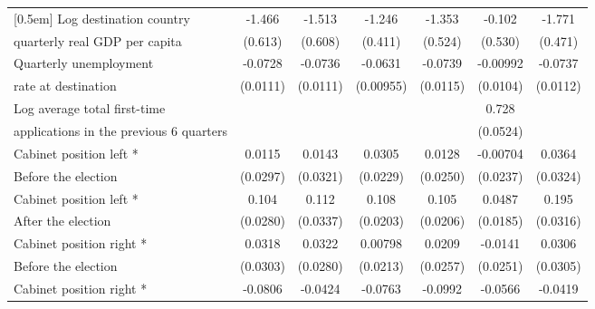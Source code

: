 \begin{table}[htbp]
\begin{tabular}{l*{6}{c}}
[0.5em]
Log destination country &      -1.466\sym{*}  &      -1.513\sym{*}  &      -1.246\sym{**} &      -1.353\sym{*}  &      -0.102         &      -1.771\sym{***}\\
quarterly real GDP per capita                    &     (0.613)         &     (0.608)         &     (0.411)         &     (0.524)         &     (0.530)         &     (0.471)         \\
[0.5em]
Quarterly unemployment &     -0.0728\sym{***}&     -0.0736\sym{***}&     -0.0631\sym{***}&     -0.0739\sym{***}&    -0.00992         &     -0.0737\sym{***}\\
rate at destination                    &    (0.0111)         &    (0.0111)         &   (0.00955)         &    (0.0115)         &    (0.0104)         &    (0.0112)         \\
[0.5em]
Log average total first-time &                     &                     &                     &                     &       0.728\sym{***}&                     \\
applications in the previous 6 quarters                    &                     &                     &                     &                     &    (0.0524)         &                     \\
[0.5em]
Cabinet position left * &      0.0115         &      0.0143         &      0.0305         &      0.0128         &    -0.00704         &      0.0364         \\
Before the election                    &    (0.0297)         &    (0.0321)         &    (0.0229)         &    (0.0250)         &    (0.0237)         &    (0.0324)         \\
[0.5em]
Cabinet position left * &       0.104\sym{***}&       0.112\sym{***}&       0.108\sym{***}&       0.105\sym{***}&      0.0487\sym{*}  &       0.195\sym{***}\\
After the election                    &    (0.0280)         &    (0.0337)         &    (0.0203)         &    (0.0206)         &    (0.0185)         &    (0.0316)         \\
[0.5em]
Cabinet position right * &      0.0318         &      0.0322         &     0.00798         &      0.0209         &     -0.0141         &      0.0306         \\
Before the election                   &    (0.0303)         &    (0.0280)         &    (0.0213)         &    (0.0257)         &    (0.0251)         &    (0.0305)         \\
[0.5em]
Cabinet position right * &     -0.0806\sym{**} &     -0.0424         &     -0.0763\sym{**} &     -0.0992\sym{***}&     -0.0566\sym{*}  &     -0.0419         \\

\end{tabular}
\end{table}
